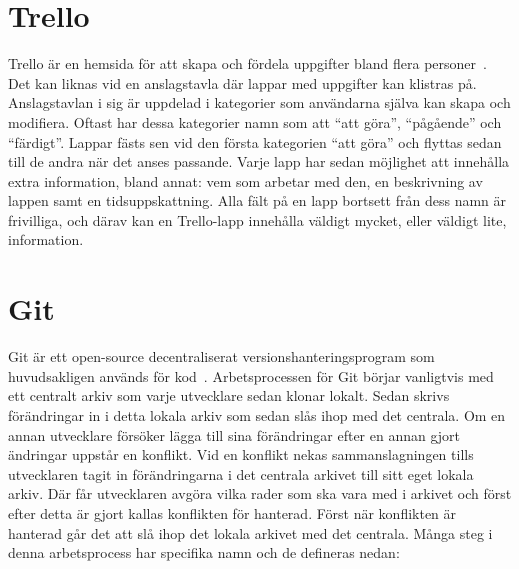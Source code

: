 \section{Trello}
Trello är en hemsida för att skapa och fördela uppgifter bland flera personer~\cite{Trello}. Det kan liknas vid en anslagstavla där lappar med uppgifter kan klistras på. Anslagstavlan i sig är uppdelad i kategorier som användarna själva kan skapa och modifiera. Oftast har dessa kategorier namn som att ``att göra'', ``pågående'' och ``färdigt''. Lappar fästs sen vid den första kategorien ``att göra'' och flyttas sedan till de andra när det anses passande. Varje lapp har sedan möjlighet att innehålla extra information, bland annat: vem som arbetar med den, en beskrivning av lappen samt en tidsuppskattning. Alla fält på en lapp bortsett från dess namn är frivilliga, och därav kan en Trello-lapp innehålla väldigt mycket, eller väldigt lite, information.

\section{Git}
Git är ett open-source decentraliserat versionshanteringsprogram som huvudsakligen används för kod~\cite{Git}. Arbetsprocessen för Git börjar vanligtvis med ett centralt arkiv som varje utvecklare sedan klonar lokalt. Sedan skrivs förändringar in i detta lokala arkiv som sedan slås ihop med det centrala. Om en annan utvecklare försöker lägga till sina förändringar efter en annan gjort ändringar uppstår en konflikt. Vid en konflikt nekas sammanslagningen tills utvecklaren tagit in förändringarna i det centrala arkivet till sitt eget lokala arkiv. Där får utvecklaren avgöra vilka rader som ska vara med i arkivet och först efter detta är gjort kallas konflikten för hanterad. Först när konflikten är hanterad går det att slå ihop det lokala arkivet med det centrala. Många steg i denna arbetsprocess har specifika namn och de defineras nedan:

